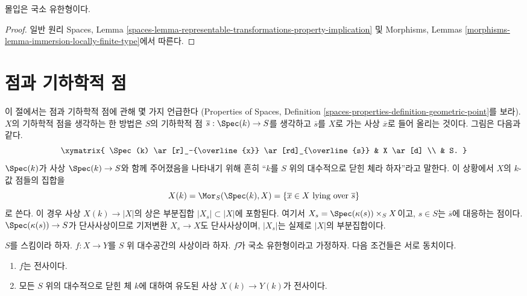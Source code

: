 \begin{lemma}
\label{lemma-immersion-locally-finite-type}
몰입은 국소 유한형이다.
\end{lemma}

\begin{proof}
일반 원리 Spaces, Lemma
\ref{spaces-lemma-representable-transformations-property-implication} 및
Morphisms, Lemmas
\ref{morphisms-lemma-immersion-locally-finite-type}에서 따른다.
\end{proof}

\section{점과 기하학적 점}
\label{section-points-fields}

\noindent
이 절에서는 점과 기하학적 점에 관해 몇 가지 언급한다
(Properties of Spaces, Definition
\ref{spaces-properties-definition-geometric-point}를 보라).
$X$의 기하학적 점을 생각하는 한 방법은 $S$의 기하학적 점
$\overline{s} : \Spec(k) \to S$를 생각하고
$\overline{s}$를 $X$로 가는 사상 $\overline{x}$로 들어 올리는 것이다.
그림은 다음과 같다.
$$
\xymatrix{
\Spec(k) \ar[r]_-{\overline{x}} \ar[rd]_{\overline{s}} & X \ar[d] \\
& S.
}
$$
$\Spec(k)$가 사상 $\Spec(k) \to S$와 함께 주어졌음을 나타내기 위해
흔히 “$k$를 $S$ 위의 대수적으로 닫힌 체라 하자”라고 말한다.
이 상황에서 $X$의 $k$-값 점들의 집합을
$$
X(k) = \Mor_S(\Spec(k), X) =
\{\overline{x} \in X\text{ lying over }\overline{s}\}
$$
로 쓴다. 이 경우 사상 $X(k) \to |X|$의 상은 부분집합
$|X_s| \subset |X|$에 포함된다. 여기서
$X_s = \Spec(\kappa(s)) \times_S X$이고, $s \in S$는
$\overline{s}$에 대응하는 점이다.
$\Spec(\kappa(s)) \to S$가 단사사상이므로 기저변환
$X_s \to X$도 단사사상이며, $|X_s|$는 실제로 $|X|$의 부분집합이다.

\begin{lemma}
\label{lemma-locally-finite-type-surjective-geometric-points}
$S$를 스킴이라 하자. $f : X \to Y$를 $S$ 위 대수공간의
사상이라 하자. $f$가 국소 유한형이라고 가정하자.
다음 조건들은 서로 동치이다.
\begin{enumerate}
\item $f$는 전사이다.
\item 모든 $S$ 위의 대수적으로 닫힌 체 $k$에 대하여 유도된 사상
$X(k) \to Y(k)$가 전사이다.
\end{enumerate}
\end{lemma}

